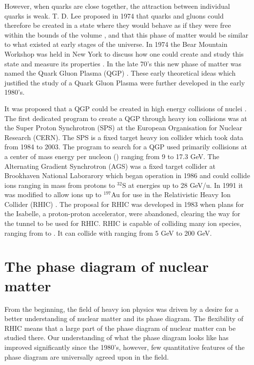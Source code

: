 However, when quarks are close together, the attraction between individual quarks is weak.  T. D. Lee proposed in 1974 that quarks and gluons could therefore be created in a state where they would behave as if they were free within the bounds of the volume \cite{Baym:2001in}, and that this phase of matter would be similar to what existed at early stages of the universe.  In 1974 the Bear Mountain Workshop was held in New York to discuss how one could create and study this state and measure its properties \cite{Baym:2001in}.  In the late 70's this new phase of matter was named the Quark Gluon Plasma (QGP) \cite{Baym:2001in}.  These early theoretical ideas which justified the study of a Quark Gluon Plasma were further developed in the early 1980's.

It was proposed that a QGP could be created in high energy collisions of nuclei \cite{Baym:2001in,0954-3899-34-8-S02,tdleehistory}.  The first dedicated program to create a QGP through heavy ion collisions was at the Super Proton Synchrotron (SPS) at the European Organisation for Nuclear Research (CERN).  The SPS is a fixed target heavy ion collider which took data from 1984 to 2003.  The program to search for a QGP used primarily \Pb collisions at a center of mass energy per nucleon (\sNN) ranging from 9 to 17.3 GeV.  The Alternating Gradient Synchrotron (AGS) was a fixed target collider at Brookhaven National Laborarory which began operation in 1986 and could collide ions ranging in mass from protons to $^{32}$S at energies up to 28 GeV/u.  In 1991 it was modified to allow ions up to $^{197}$Au for use in the Relativistic Heavy Ion Collider (RHIC) \cite{AGS}. The proposal for RHIC was developed in 1983 when plans for the Isabelle, a proton-proton accelerator, were abandoned, clearing the way for the tunnel to be used for RHIC.  RHIC is capable of colliding many ion species, ranging from \pp to \Au.  It can collide \Au with \sNN ranging from 5 GeV to 200 GeV.

\section{The phase diagram of nuclear matter \label{PhaseDiagram}}
From the beginning, the field of heavy ion physics was driven by a desire for a better understanding of nuclear matter and its phase diagram.  The flexibility of RHIC means that a large part of the phase diagram of nuclear matter can be studied there.  Our understanding of what the phase diagram looks like has improved significantly since the 1980's, however, few quantitative features of the phase diagram are universally agreed upon in the field.


